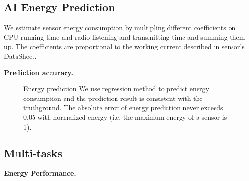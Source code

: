 \subsection{AI Energy Prediction}

We estimate sensor energy consumption by multipling different coefficients on
CPU running time and radio listening and transmitting time and summing them up.
The coefficients are proportional to the working current described in sensor's
DataSheet.

\textbf{Prediction accuracy.}

\begin{figure}[htbp]
	\centering
	\hspace{0.3cm}
	\vspace{-0.1in}
	\caption{Energy prediction
		\textnormal{
			We use regression method to predict energy consumption and the
			prediction result is consistent with the truthground.  The absolute
			error of energy prediction never exceeds 0.05 with normalized energy
			(i.e. the maximum energy of a sensor is 1).
		}
	}
	\label{fig:energy_pred}
\end{figure}

\subsection{Multi-tasks}
\textbf{Energy Performance.}

